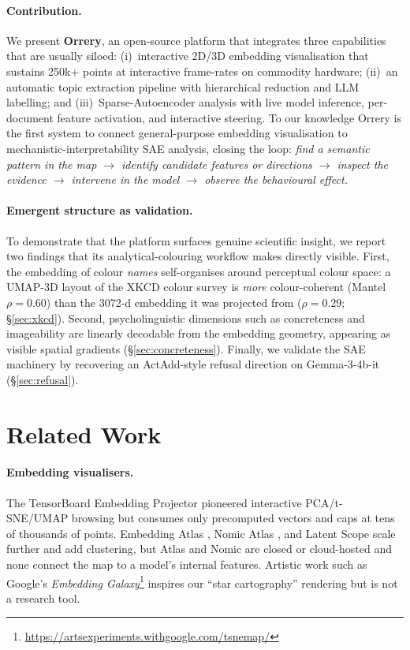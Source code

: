\documentclass[11pt]{article}
\begin{document}
\paragraph{Contribution.} We present \textbf{Orrery}, an open-source
platform that integrates three capabilities that are usually siloed:
(i)~interactive 2D/3D embedding visualisation that sustains 250k+ points at
interactive frame-rates on commodity hardware; (ii)~an automatic topic
extraction pipeline with hierarchical reduction and LLM labelling; and
(iii)~Sparse-Autoencoder analysis with live model inference, per-document
feature activation, and interactive steering. To our knowledge Orrery is
the first system to connect general-purpose embedding visualisation to
mechanistic-interpretability SAE analysis, closing the loop:
\emph{find a semantic pattern in the map $\rightarrow$ identify candidate
features or directions $\rightarrow$ inspect the evidence $\rightarrow$
intervene in the model $\rightarrow$ observe the behavioural effect.}

\paragraph{Emergent structure as validation.} To demonstrate that the
platform surfaces genuine scientific insight, we report two findings that
its analytical-colouring workflow makes directly visible. First, the
embedding of colour \emph{names} self-organises around perceptual colour
space: a UMAP-3D layout of the XKCD colour survey is \emph{more}
colour-coherent (Mantel $\rho = 0.60$) than the 3072-d embedding it was
projected from ($\rho = 0.29$; \S\ref{sec:xkcd}). Second, psycholinguistic
dimensions such as concreteness and imageability are linearly decodable
from the embedding geometry, appearing as visible spatial gradients
(\S\ref{sec:concreteness}). Finally, we validate the SAE machinery by
recovering an ActAdd-style refusal direction on Gemma-3-4b-it
(\S\ref{sec:refusal}).

\section{Related Work}
\label{sec:related}

\paragraph{Embedding visualisers.} The TensorBoard Embedding Projector
\citep{smilkov2016projector} pioneered interactive PCA/t-SNE/UMAP browsing
but consumes only precomputed vectors and caps at tens of thousands of
points. Embedding Atlas \citep{embeddingatlas}, Nomic Atlas
\citep{nomicatlas}, and Latent Scope \citep{latentscope} scale further and
add clustering, but Atlas and Nomic are closed or cloud-hosted and none
connect the map to a model's internal features. Artistic work such as
Google's \emph{Embedding Galaxy}\footnote{\url{https://artsexperiments.withgoogle.com/tsnemap/}}
inspires our ``star cartography'' rendering but is not a research tool.
\end{document}
